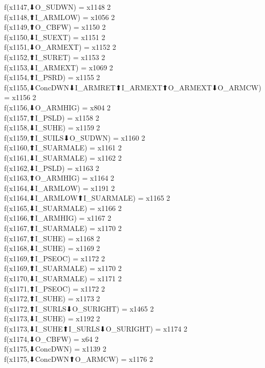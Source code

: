 f(x1147,⬇O_SUDWN) = x1148 {2} \\
f(x1148,⬆I_ARMLOW) = x1056 {2} \\
f(x1149,⬆O_CBFW) = x1150 {2} \\
f(x1150,⬇I_SUEXT) = x1151 {2} \\
f(x1151,⬇O_ARMEXT) = x1152 {2} \\
f(x1152,⬆I_SURET) = x1153 {2} \\
f(x1153,⬇I_ARMEXT) = x1069 {2} \\
f(x1154,⬆I_PSRD) = x1155 {2} \\
f(x1155,⬇ConcDWN⬇I_ARMRET⬆I_ARMEXT⬆O_ARMEXT⬇O_ARMCW) = x1156 {2} \\
f(x1156,⬇O_ARMHIG) = x804 {2} \\
f(x1157,⬆I_PSLD) = x1158 {2} \\
f(x1158,⬇I_SUHE) = x1159 {2} \\
f(x1159,⬆I_SUILS⬇O_SUDWN) = x1160 {2} \\
f(x1160,⬆I_SUARMALE) = x1161 {2} \\
f(x1161,⬇I_SUARMALE) = x1162 {2} \\
f(x1162,⬇I_PSLD) = x1163 {2} \\
f(x1163,⬆O_ARMHIG) = x1164 {2} \\
f(x1164,⬇I_ARMLOW) = x1191 {2} \\
f(x1164,⬇I_ARMLOW⬆I_SUARMALE) = x1165 {2} \\
f(x1165,⬇I_SUARMALE) = x1166 {2} \\
f(x1166,⬆I_ARMHIG) = x1167 {2} \\
f(x1167,⬆I_SUARMALE) = x1170 {2} \\
f(x1167,⬆I_SUHE) = x1168 {2} \\
f(x1168,⬇I_SUHE) = x1169 {2} \\
f(x1169,⬆I_PSEOC) = x1172 {2} \\
f(x1169,⬆I_SUARMALE) = x1170 {2} \\
f(x1170,⬇I_SUARMALE) = x1171 {2} \\
f(x1171,⬆I_PSEOC) = x1172 {2} \\
f(x1172,⬆I_SUHE) = x1173 {2} \\
f(x1172,⬆I_SURLS⬇O_SURIGHT) = x1465 {2} \\
f(x1173,⬇I_SUHE) = x1192 {2} \\
f(x1173,⬇I_SUHE⬆I_SURLS⬇O_SURIGHT) = x1174 {2} \\
f(x1174,⬇O_CBFW) = x64 {2} \\
f(x1175,⬇ConcDWN) = x1139 {2} \\
f(x1175,⬇ConcDWN⬆O_ARMCW) = x1176 {2} \\
